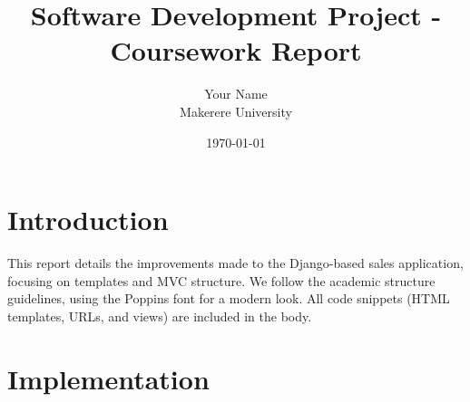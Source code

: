 \documentclass[12pt]{article}
\title{Software Development Project - Coursework Report}
\author{Your Name \\ Makerere University}
\date{\today}
\begin{document}
\maketitle
\tableofcontents
\newpage

\section{Introduction}
This report details the improvements made to the Django-based sales application, focusing on templates and MVC structure. We follow the academic structure guidelines, using the Poppins font for a modern look. All code snippets (HTML templates, URLs, and views) are included in the body.

\section{Implementation}
\end{document}
